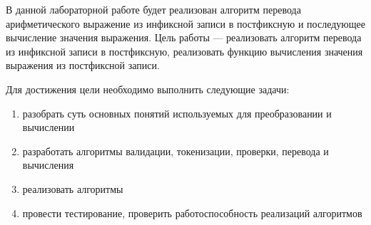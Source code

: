 В данной лабораторной работе будет реализован алгоритм перевода арифметического выражение из инфиксной записи в постфиксную и последующее вычисление значения выражения.
Цель работы --- реализовать алгоритм перевода из инфиксной записи в постфиксную, реализовать функцию вычисления значения выражения из постфиксной записи.

Для достижения цели необходимо выполнить следующие задачи:
\begin{enumerate}
\item разобрать суть основных понятий используемых для преобразовании и вычислении
\item разработать алгоритмы валидации, токенизации, проверки, перевода и вычисления 
\item реализовать алгоритмы 
\item провести тестирование, проверить работоспособность реализаций алгоритмов 
\end{enumerate}
\clearpage
